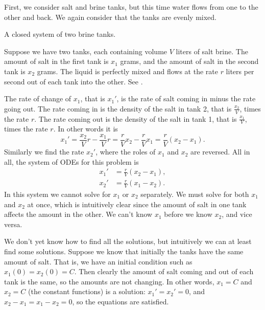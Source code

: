 \begin{example} \label{sintro:closedbrine-example}
First, we consider salt and brine tanks, but this time water flows
from one to the other and back.  We again consider that the tanks are
evenly mixed.

\begin{myfig}
\capstart
{}
\caption{A closed system of two brine tanks.\label{sintro:closedbrine}}
\end{myfig}

Suppose we have two tanks, each containing volume $V$ liters of salt brine.
The amount of salt in the first tank is $x_1$ grams, and the amount of salt
in the second tank is $x_2$ grams.  The liquid is perfectly mixed and
flows at the rate $r$ liters per second out of each tank into the other.
See .

The rate of change of $x_1$,
that is $x_1'$, is the
rate of salt coming in minus the rate going out.
The rate coming in is the
density of the salt in tank 2, that is $\frac{x_2}{V}$, times the rate $r$.
The rate coming out is the
density of the salt in tank 1, that is $\frac{x_1}{V}$, times the rate $r$.
In other words it is
\begin{equation*}
x_1' = \frac{x_2}{V} r - \frac{x_1}{V} r =
\frac{r}{V} x_2 - \frac{r}{V} x_1  = \frac{r}{V} (x_2-x_1).
\end{equation*}
Similarly we find the rate $x_2'$, where the roles of $x_1$ and $x_2$
are reversed.  All in all, the system of ODEs for this problem is
\begin{align*}
x_1' & = \frac{r}{V} (x_2-x_1), \\
x_2' & = \frac{r}{V} (x_1-x_2).
\end{align*}
In this system we cannot solve for $x_1$ or $x_2$ separately.  We must
solve for both $x_1$ and $x_2$ at once, which is intuitively clear since
the amount of salt in one tank affects the amount in the other.
We can't know $x_1$ before we know $x_2$, and vice versa.

We don't yet know how to find all the solutions, but
intuitively we can at least find some solutions.  Suppose we
know that initially the tanks have the same amount of salt.  That is,
we have an initial condition such as $x_1(0)=x_2(0) = C$.  Then clearly the
amount of salt coming and out of each tank is the same, so the amounts are
not changing.  In other words, $x_1 = C$ and $x_2 = C$ (the constant
functions) is a solution:  $x_1' = x_2' = 0$, and
$x_2-x_1 = x_1-x_2 = 0$, so the equations are satisfied.


\end{example}
